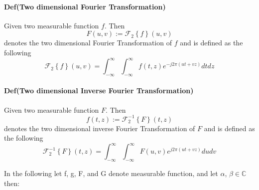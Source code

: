 \documentclass{paper}
\begin{document}
\paragraph{Def(Two dimensional Fourier Transformation)} Given two measurable function $f$. Then
\begin{equation}
    F(u,v) := \mathcal{F}_2 \left \{ f  \right\}(u,v)
\end{equation}
denotes the two dimensional Fourier Transformation of $f$ and is defined as the following \\
\begin{equation}
    \mathcal{F}_2 \left \{ f  \right\}(u,v) = \int_{-\infty}^{\infty} \int_{-\infty}^{\infty} f(t,z) e^{-j 2 \pi (ut+vz)} dt dz
\label{eq:fourier2}
\end{equation}

\paragraph{Def(Two dimensional Inverse Fourier Transformation)} Given two measurable function $F$. Then
\begin{equation}
    f(t,z) := \mathcal{F}^{-1}_{2} \left \{ F  \right\}(t,z)
\end{equation}
denotes the two dimensional inverse Fourier Transformation of $F$ and is defined as the following \\
\begin{equation}
    \mathcal{F}^{-1}_{2} \left \{ F \right\}(t,z) = \int_{-\infty}^{\infty} \int_{-\infty}^{\infty} F(u,v) e^{j 2 \pi (ut+vz)} du dv
\label{eq:fourier2}
\end{equation}

In the following let f, g, F, and G denote measurable function, and let $\alpha$, $\beta \in \mathbb{C}$ then:
\end{document}
